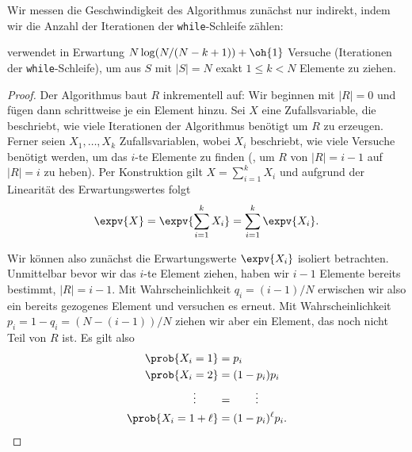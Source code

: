 \bigskip

Wir messen die Geschwindigkeit des Algorithmus zunächst nur indirekt, indem wir die Anzahl der Iterationen der \texttt{while}-Schleife zählen:

\begin{lemma}\label{lemma:basis-ziehen-ohne-zuruecklegen-versuche}
 verwendet in Erwartung $N \log(N/(N-k+1)) + \oh{1}$ Versuche (Iterationen der \texttt{while}-Schleife), um aus $S$ mit $|S| = N$ exakt $1 \le k < N$ Elemente zu ziehen.
\end{lemma}

\begin{proof}
    Der Algorithmus baut $R$ inkrementell auf: Wir beginnen mit $|R| = 0$ und fügen dann schrittweise je ein Element hinzu.
    Sei $X$ eine Zufallsvariable, die beschriebt, wie viele Iterationen der Algorithmus benötigt um $R$ zu erzeugen.
    Ferner seien $X_1, \ldots, X_k$ Zufallsvariablen, wobei $X_i$ beschriebt, wie viele Versuche benötigt werden, um das $i$-te Elemente zu finden (\dh, um $R$ von $|R| = i - 1$ auf  $|R| = i$ zu heben).
    Per Konstruktion gilt $X = \sum_{i=1}^k X_i$ und aufgrund der Linearität des Erwartungswertes folgt
    \begin{equation}
        \expv{X} = \expv{\sum_{i=1}^k X_i} = \sum_{i=1}^k \expv{X_i}. \label{eq:basis-ziehen-ohne-zuruecklegen_expvX}
    \end{equation}

    Wir können also zunächst die Erwartungswerte $\expv{X_i}$ isoliert betrachten.
    Unmittelbar bevor wir das $i$-te Element ziehen, haben wir $i-1$ Elemente bereits bestimmt, \dh $|R| = i - 1$.
    Mit Wahrscheinlichkeit $q_i = (i-1) / N$ erwischen wir also ein bereits gezogenes Element und versuchen es erneut.
    Mit Wahrscheinlichkeit $p_i = 1 - q_i = (N - (i - 1)) / N$ ziehen wir aber ein Element, das noch nicht Teil von $R$ ist.
    Es gilt also
    \vspace{-2ex}
    \begin{align*}
        \prob{X_i = 1}            & = p_i                  \\
        \prob{X_i = 2}            & = (1 -p_i) p_i         \\
        \vdots         \quad\quad & = \quad\quad \vdots    \\
        \prob{X_i = 1 + \ell}     & = (1- p_i)^{\ell} p_i.
    \end{align*}


\end{proof}
